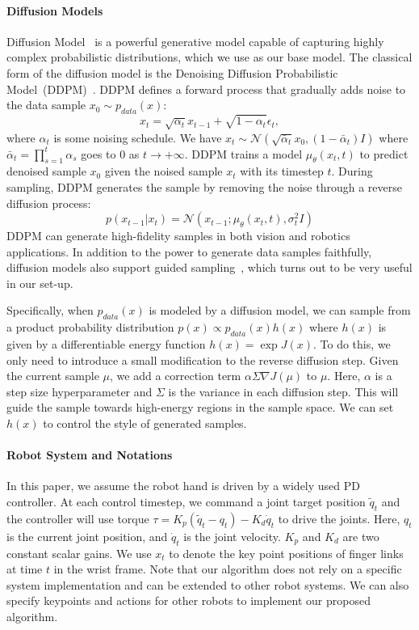 \paragraph{Diffusion Models} Diffusion Model~\cite{ho2020denoising} is a powerful generative model capable of capturing highly complex probabilistic distributions, which we use as our base model. The classical form of the diffusion model is the Denoising Diffusion Probabilistic Model~(DDPM)~\cite{ho2020denoising}. DDPM defines a forward process that gradually adds noise to the data sample $x_0\sim p_{data}(x)$:
\begin{equation}
x_t = \sqrt{\alpha_t} x_{t-1} + \sqrt{1 - \alpha_t} \epsilon_t,
\end{equation}
where $\alpha_t$ is some noising schedule. We have $x_t \sim \mathcal{N}(\sqrt{\bar{\alpha}_t} x_0, (1 - \bar\alpha_t) I)$ where $\bar\alpha_t = \prod_{s=1}^t \alpha_s$ goes to 0 as $t\to+\infty$. DDPM trains a model $\mu_\theta(x_t, t)$ to predict denoised sample $x_0$ given the noised sample $x_t$ with its timestep $t$. During sampling, DDPM generates the sample by removing the noise through a reverse diffusion process:
\begin{equation}
p(x_{t-1} | x_t) = \mathcal{N}(x_{t-1}; \mu_\theta(x_t, t), \sigma_t^2 I)
\end{equation}
DDPM can generate high-fidelity samples in both vision and robotics applications. In addition to the power to generate data samples faithfully, diffusion models also support guided sampling~\cite{janner2022planning}, which turns out to be very useful in our set-up. 

Specifically,  when $p_{data}(x)$ is modeled by a diffusion model, we can sample from a product probability distribution $p(x) \propto p_{data}(x) h(x)$ where $h(x)$ is given by a differentiable energy function $h(x)=\exp J(x)$. To do this, we only need to introduce a small modification to the reverse diffusion step. Given the current sample $\mu$, we add a correction term $\alpha\Sigma\nabla J{(\mu)}$ to $\mu$. Here, $\alpha$ is a step size hyperparameter and $\Sigma$ is the variance in each diffusion step. This will guide the sample towards high-energy regions in the sample space. We can set $h(x)$ to control the style of generated samples.

\paragraph{Robot System and Notations} In this paper, we assume the robot hand is driven by a widely used PD controller. At each control timestep, we command a joint target position $\tilde{q}_t$ and the controller will use torque $\tau = K_p (\tilde{q}_t - q_t) - K_d \dot{q}_t$ to drive the joints.  Here, $q_t$ is the current joint position, and $\dot{q}_t$ is the joint velocity. $K_p$ and $K_d$ are two constant scalar gains. We use $x_t$ to denote the key point positions of finger links at time $t$ in the wrist frame. Note that our algorithm does not rely on a specific system implementation and can be extended to other robot systems. We can also specify keypoints and actions for other robots to implement our proposed algorithm.

